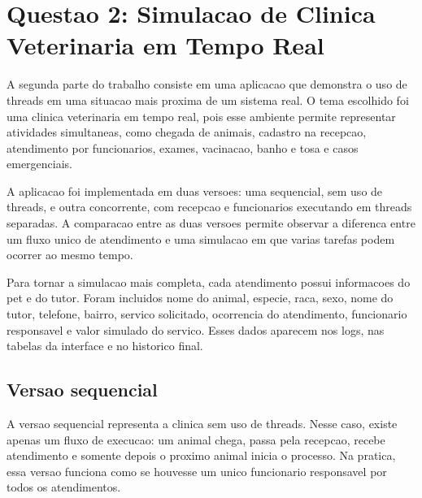 %
%


\renewcommand{\lstlistingname}{Codigo}
\lstset{style=JavaStyle}

\section{Questao 2: Simulacao de Clinica Veterinaria em Tempo Real}

A segunda parte do trabalho consiste em uma aplicacao que demonstra o uso de threads em uma situacao mais proxima de um sistema real. O tema escolhido foi uma clinica veterinaria em tempo real, pois esse ambiente permite representar atividades simultaneas, como chegada de animais, cadastro na recepcao, atendimento por funcionarios, exames, vacinacao, banho e tosa e casos emergenciais.

A aplicacao foi implementada em duas versoes: uma sequencial, sem uso de threads, e outra concorrente, com recepcao e funcionarios executando em threads separadas. A comparacao entre as duas versoes permite observar a diferenca entre um fluxo unico de atendimento e uma simulacao em que varias tarefas podem ocorrer ao mesmo tempo.

Para tornar a simulacao mais completa, cada atendimento possui informacoes do pet e do tutor. Foram incluidos nome do animal, especie, raca, sexo, nome do tutor, telefone, bairro, servico solicitado, ocorrencia do atendimento, funcionario responsavel e valor simulado do servico. Esses dados aparecem nos logs, nas tabelas da interface e no historico final.

\subsection{Versao sequencial}

A versao sequencial representa a clinica sem uso de threads. Nesse caso, existe apenas um fluxo de execucao: um animal chega, passa pela recepcao, recebe atendimento e somente depois o proximo animal inicia o processo. Na pratica, essa versao funciona como se houvesse um unico funcionario responsavel por todos os atendimentos.

